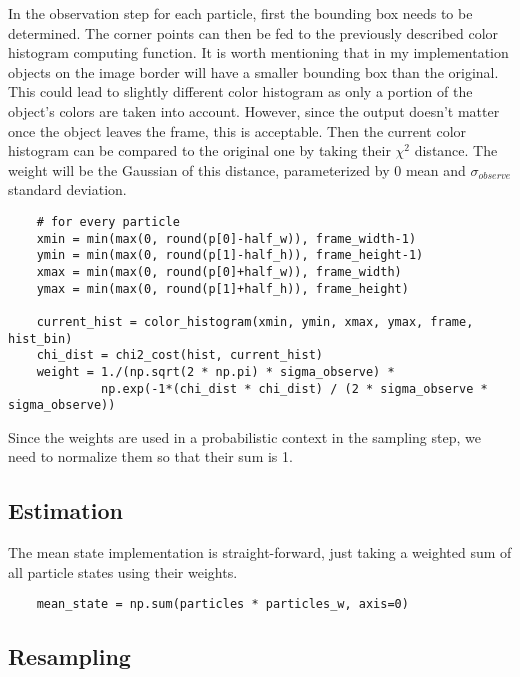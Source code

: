 \documentclass[10pt,a4paper,twoside]{article}
\begin{document}
In the observation step for each particle, first the bounding box needs to be
determined. The corner points can then be fed to the previously described color
histogram computing function. It is worth mentioning that in my implementation
objects on the image border will have a smaller bounding box than the original.
This could lead to slightly different color histogram as only a portion of the
object's colors are taken into account.  However, since the output doesn't
matter once the object leaves the frame, this is acceptable. Then the current
color histogram can be compared to the original one by taking their $\chi^2$
distance. The weight will be the Gaussian of this distance, parameterized by 0
mean and $\sigma_{observe}$ standard deviation. 

\begin{verbatim}
    # for every particle
    xmin = min(max(0, round(p[0]-half_w)), frame_width-1)
    ymin = min(max(0, round(p[1]-half_h)), frame_height-1)
    xmax = min(max(0, round(p[0]+half_w)), frame_width)
    ymax = min(max(0, round(p[1]+half_h)), frame_height)

    current_hist = color_histogram(xmin, ymin, xmax, ymax, frame, hist_bin)
    chi_dist = chi2_cost(hist, current_hist)
    weight = 1./(np.sqrt(2 * np.pi) * sigma_observe) * 
             np.exp(-1*(chi_dist * chi_dist) / (2 * sigma_observe * sigma_observe))
\end{verbatim}

Since the weights are used in a probabilistic context in the sampling step, we
need to normalize them so that their sum is 1.

\subsection{Estimation}

The mean state implementation is straight-forward, just taking a weighted sum of all particle states using their weights.
\begin{verbatim}
    mean_state = np.sum(particles * particles_w, axis=0)
\end{verbatim}

\subsection{Resampling}
\end{document}
